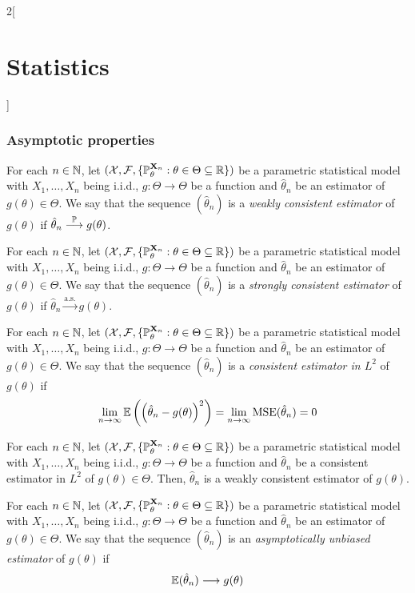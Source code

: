 \documentclass[../../../main.tex]{subfiles}
\begin{document}
\begin{multicols}{2}[\section{Statistics}]
  \subsubsection{Asymptotic properties}
  \begin{definition}
    For each $n\in\mathbb{N}$, let $(\mathcal{X},\mathcal{F},\{\mathbb{P}_{\theta}^{\boldsymbol{\mathrm{X}}_n}:\theta\in\Theta\subseteq \mathbb{R}\})$ be a parametric statistical model with $X_1,\ldots,X_n$ being i.i.d., $g:\Theta\rightarrow\Theta$ be a function and ${\hat\theta}_n$ be an estimator of $g({\theta})\in\Theta$. We say that the sequence $({{\hat\theta}}_n)$ is a \emph{weakly consistent estimator} of $g(\theta)$ if ${{\hat\theta}}_n\overset{\mathbb{P}}{\longrightarrow}g(\theta)$.
  \end{definition}
  \begin{definition}
    For each $n\in\mathbb{N}$, let $(\mathcal{X},\mathcal{F},\{\mathbb{P}_{\theta}^{\boldsymbol{\mathrm{X}}_n}:\theta\in\Theta\subseteq \mathbb{R}\})$ be a parametric statistical model with $X_1,\ldots,X_n$ being i.i.d., $g:\Theta\rightarrow\Theta$ be a function and ${\hat\theta}_n$ be an estimator of $g({\theta})\in\Theta$. We say that the sequence $({{\hat\theta}}_n)$ is a \emph{strongly consistent estimator} of $g(\theta)$ if ${{\hat\theta}}_n\overset{\text{a.s.}}{\longrightarrow}g(\theta)$.
  \end{definition}
  \begin{definition}
    For each $n\in\mathbb{N}$, let $(\mathcal{X},\mathcal{F},\{\mathbb{P}_{\theta}^{\boldsymbol{\mathrm{X}}_n}:\theta\in\Theta\subseteq \mathbb{R}\})$ be a parametric statistical model with $X_1,\ldots,X_n$ being i.i.d., $g:\Theta\rightarrow\Theta$ be a function and ${\hat\theta}_n$ be an estimator of $g({\theta})\in\Theta$. We say that the sequence $({{\hat\theta}}_n)$ is a \emph{consistent estimator in $L^2$} of $g(\theta)$ if $$\lim_{n\to\infty}\operatorname{\mathbb{E}}\left({\left({\hat\theta}_n-g({\theta})\right)}^2\right)=\lim_{n\to\infty}\operatorname{MSE}({\hat\theta}_n)=0$$
  \end{definition}
  \begin{proposition}
    For each $n\in\mathbb{N}$, let $(\mathcal{X},\mathcal{F},\{\mathbb{P}_{\theta}^{\boldsymbol{\mathrm{X}}_n}:\theta\in\Theta\subseteq \mathbb{R}\})$ be a parametric statistical model with $X_1,\ldots,X_n$ being i.i.d., $g:\Theta\rightarrow\Theta$ be a function and ${\hat\theta}_n$ be a consistent estimator in $L^2$ of $g({\theta})\in\Theta$. Then, ${{\hat\theta}}_n$ is a weakly consistent estimator of $g(\theta)$.
  \end{proposition}
  \begin{definition}
    For each $n\in\mathbb{N}$, let $(\mathcal{X},\mathcal{F},\{\mathbb{P}_{\theta}^{\boldsymbol{\mathrm{X}}_n}:\theta\in\Theta\subseteq \mathbb{R}\})$ be a parametric statistical model with $X_1,\ldots,X_n$ being i.i.d., $g:\Theta\rightarrow\Theta$ be a function and ${{\hat\theta}}_n$ be an estimator of $g(\theta)\in\Theta$. We say that the sequence $({{\hat\theta}}_n)$ is an \emph{asymptotically unbiased estimator} of $g(\theta)$ if $$\operatorname{\mathbb{E}}({{\hat\theta}}_n)\longrightarrow g(\theta)$$

\end{definition}
\end{multicols}
\end{document}
